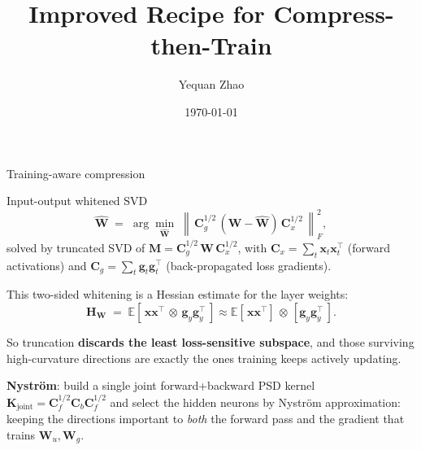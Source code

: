 \documentclass[9pt]{beamer}
\title{Improved Recipe for Compress-then-Train}
\author{Yequan Zhao}
\date{\today}
\newcommand{\mat}[1]{\mathbf{#1}}
\newcommand{\norm}[1]{\left\lVert#1\right\rVert}
\begin{document}
	
	\maketitle
	
	\begin{frame}{Training-aware compression}
		
		Input-output whitened SVD
		\[
		\hat{\mat{W}}
		\;=\;
		\arg\min_{\hat{\mat{W}}}\;
		\norm{\,\mat{C}_g^{1/2}\,(\mat{W}-\hat{\mat{W}})\,\mat{C}_x^{1/2}\,}_F^2 ,
		\]
		solved by truncated SVD of $\mat{M}=\mat{C}_g^{1/2}\,\mat{W}\,\mat{C}_x^{1/2}$,
		with $\mat{C}_x=\sum_t\mat{x}_t\mat{x}_t^{\!\top}$ (forward activations) and
		$\mat{C}_g=\sum_t\mat{g}_t\mat{g}_t^{\!\top}$ (back-propagated loss gradients).
		
		\vspace{0.8em}
		This two-sided whitening is a Hessian estimate for the layer weights:
		\[
		\mat{H}_{\mat{W}} \;=\; \mathbb{E}\!\left[\,\mat{x}\mat{x}^{\!\top}
		\,\otimes\, \mat{g}_y\mat{g}_y^{\!\top}\,\right]
		\approx \mathbb{E}\!\left[\,\mat{x}\mat{x}^{\!\top}\right]
		\,\otimes\, \left[\mat{g}_y\mat{g}_y^{\!\top}\,\right].
		\]
		
		\vspace{0.4em}
		So truncation \textbf{discards the least loss-sensitive subspace}, and those
		surviving high-curvature directions are exactly the ones training keeps
		actively updating.
		
		\textbf{Nystr\"om}: build a single joint forward+backward PSD kernel
		$\mat{K}_{\text{joint}}=\mat{C}_f^{1/2}\mat{C}_b\mat{C}_f^{1/2}$ and select the
		hidden neurons by Nystr\"om approximation: keeping the directions important to
		\emph{both} the forward pass and the gradient that trains $\mat{W}_u,\mat{W}_g$.
		
	\end{frame}
\end{document}
